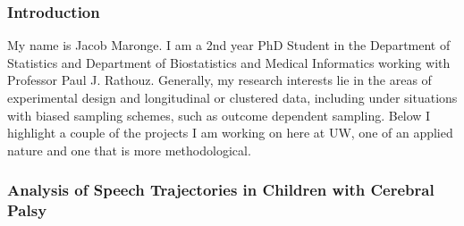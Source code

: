 \documentclass[11pt]{article}
\begin{document}
\begin{multicols}{2} 

\subsubsection*{Introduction}
My name is Jacob Maronge. I am a 2nd year PhD Student in the Department of Statistics and Department of Biostatistics and Medical Informatics working with Professor Paul J. Rathouz. Generally, my research interests lie in the areas of experimental design and longitudinal or clustered data, including under situations with biased sampling schemes, such as outcome dependent sampling. Below I highlight a couple of the projects I am working on here at UW, one of an applied nature and one that is more methodological.

\subsubsection*{Analysis of Speech Trajectories in Children with Cerebral Palsy}


\end{multicols}
\end{document}
